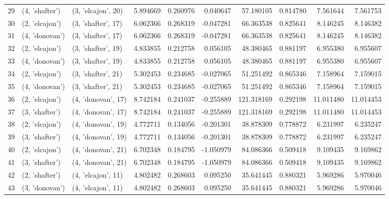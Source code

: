 \begin{tabular}{lllrrrrrrr}
29 &   (4, 'shafter') &  (3, 'elcajon', 20) &  5.894669 &  0.260976 &  0.040647 &   57.180105 &  0.814780 &   7.561644 &   7.561753 \\
30 &   (2, 'elcajon') &  (3, 'shafter', 17) &  6.062366 &  0.268319 & -0.047281 &   66.363538 &  0.825641 &   8.146245 &   8.146382 \\
31 &   (4, 'donovan') &  (3, 'shafter', 17) &  6.062366 &  0.268319 & -0.047281 &   66.363538 &  0.825641 &   8.146245 &   8.146382 \\
32 &   (2, 'elcajon') &  (3, 'shafter', 19) &  4.833855 &  0.212758 &  0.056105 &   48.380465 &  0.881197 &   6.955380 &   6.955607 \\
33 &   (4, 'donovan') &  (3, 'shafter', 19) &  4.833855 &  0.212758 &  0.056105 &   48.380465 &  0.881197 &   6.955380 &   6.955607 \\
34 &   (2, 'elcajon') &  (3, 'shafter', 21) &  5.302453 &  0.234685 & -0.027065 &   51.251492 &  0.865346 &   7.158964 &   7.159015 \\
35 &   (4, 'donovan') &  (3, 'shafter', 21) &  5.302453 &  0.234685 & -0.027065 &   51.251492 &  0.865346 &   7.158964 &   7.159015 \\
36 &   (2, 'elcajon') &  (4, 'donovan', 17) &  8.742184 &  0.241037 & -0.255889 &  121.318169 &  0.292198 &  11.011480 &  11.014453 \\
37 &   (3, 'shafter') &  (4, 'donovan', 17) &  8.742184 &  0.241037 & -0.255889 &  121.318169 &  0.292198 &  11.011480 &  11.014453 \\
38 &   (2, 'elcajon') &  (4, 'donovan', 19) &  4.772711 &  0.134056 & -0.201301 &   38.878309 &  0.778872 &   6.231997 &   6.235247 \\
39 &   (3, 'shafter') &  (4, 'donovan', 19) &  4.772711 &  0.134056 & -0.201301 &   38.878309 &  0.778872 &   6.231997 &   6.235247 \\
40 &   (2, 'elcajon') &  (4, 'donovan', 21) &  6.702348 &  0.184795 & -1.050979 &   84.086366 &  0.509418 &   9.109435 &   9.169862 \\
41 &   (3, 'shafter') &  (4, 'donovan', 21) &  6.702348 &  0.184795 & -1.050979 &   84.086366 &  0.509418 &   9.109435 &   9.169862 \\
42 &   (2, 'shafter') &  (4, 'elcajon', 11) &  4.802482 &  0.268603 &  0.095250 &   35.641445 &  0.880321 &   5.969286 &   5.970046 \\
43 &   (3, 'donovan') &  (4, 'elcajon', 11) &  4.802482 &  0.268603 &  0.095250 &   35.641445 &  0.880321 &   5.969286 &   5.970046 \\

\end{tabular}
